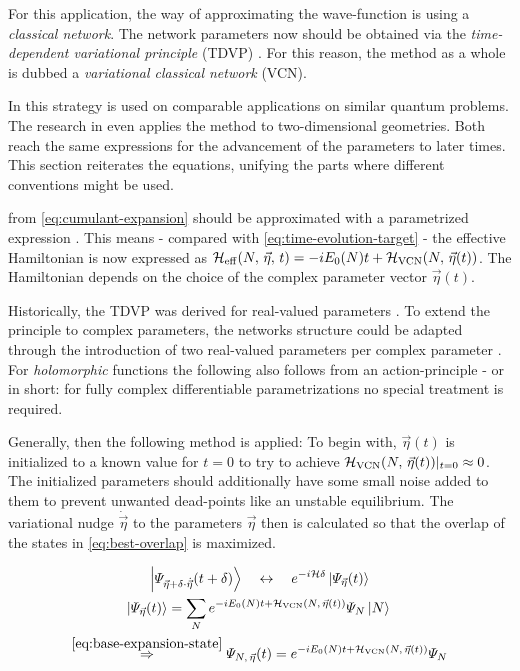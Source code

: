 For this application, the way of approximating the wave-function is using a \emph{classical network}. 
The network parameters now should be obtained via the \emph{time-dependent variational principle} (TDVP) \cite{originalDerivationTimeDependendVariationalPrinciple}.
For this reason, the method as a whole is dubbed a \emph{variational classical network} (VCN).

In \cite{variationalClassicalNetworksPaper} this strategy is used on comparable applications on similar quantum problems.
The research in \cite{probabilitySamplingRequirementVCN} even applies the method to two-dimensional geometries.
Both reach the same expressions for the advancement of the parameters to later times.
This section reiterates the equations, unifying the parts where different conventions might be used.

\HNOft from \autoref{eq:cumulant-expansion} should be approximated with a parametrized expression .
This means - compared with \autoref{eq:time-evolution-target} - the effective Hamiltonian is now expressed as $\HeffOft[N,\,\vec{\eta}] = -i E_0(N) t + \Hvcn{\vec{\eta}(t)}$.
The Hamiltonian depends on the choice of the complex parameter vector $\vec{\eta}(t)$.

Historically, the TDVP was derived for real-valued parameters \cite{originalDerivationTimeDependendVariationalPrinciple}.
To extend the principle to complex parameters, the networks structure could be adapted through the introduction of two real-valued parameters per complex parameter \cite{TDVPcomplexPrefactors}.
For \emph{holomorphic} functions the following also follows from an action-principle \cite{probabilitySamplingRequirementVCN} - or in short: for fully complex differentiable \cite{complexDifferentiation} parametrizations no special treatment is required.

Generally, then the following method is applied: To begin with, $\vec{\eta}(t)$ is initialized to a known value for $t=0$ to try to achieve $\Hvcn{\vec{\eta}(t)} \vert_{t=0} \approx 0$.
The initialized parameters should additionally have some small noise added to them to prevent unwanted dead-points like an unstable equilibrium.
The variational nudge $\dot{\vec{\eta}}$ to the parameters $\vec{\eta}$ then is calculated so that the overlap of the states in \autoref{eq:best-overlap} is maximized.

\begin{equation}
    \label{eq:best-overlap}
    \begin{gathered}
        \ketpsiEta{\vec{\eta} + \delta \cdot \dot{\vec{\eta}}}{t + \delta} \quad\leftrightarrow\quad e^{-i \hamiltonian \delta} \ketpsiEta{\vec{\eta}}{t}
        \\
        \ketpsiEta{\vec{\eta}}{t} = \lsum[N] e^{-i E_0(N) t + \Hvcn{\vec{\eta}(t)}} \psiN \ketN{}
        \\
        \stackrel{\ref{eq:base-expansion-state}}{\Rightarrow} \psiEta{N,\,\vec{\eta}}{t} = e^{-i E_0(N) t + \Hvcn{\vec{\eta}(t)}} \psiN
    \end{gathered}
\end{equation}

